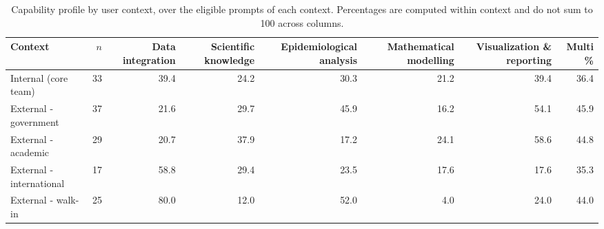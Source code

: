\begin{table}[htbp]
\centering
\caption{Capability profile by user context, over the eligible prompts of each context. Percentages are computed within context and do not sum to 100 across columns.}
\label{tab:s5-context}
\begin{tabular}{lrrrrrrr}
\toprule
Context & $n$ & Data integration & Scientific knowledge & Epidemiological analysis & Mathematical modelling & Visualization \& reporting & Multi \% \\
\midrule
Internal (core team) & 33 & 39.4 & 24.2 & 30.3 & 21.2 & 39.4 & 36.4 \\
External - government & 37 & 21.6 & 29.7 & 45.9 & 16.2 & 54.1 & 45.9 \\
External - academic & 29 & 20.7 & 37.9 & 17.2 & 24.1 & 58.6 & 44.8 \\
External - international & 17 & 58.8 & 29.4 & 23.5 & 17.6 & 17.6 & 35.3 \\
External - walk-in & 25 & 80.0 & 12.0 & 52.0 & 4.0 & 24.0 & 44.0 \\
\bottomrule
\end{tabular}
\par{}
\end{table}
